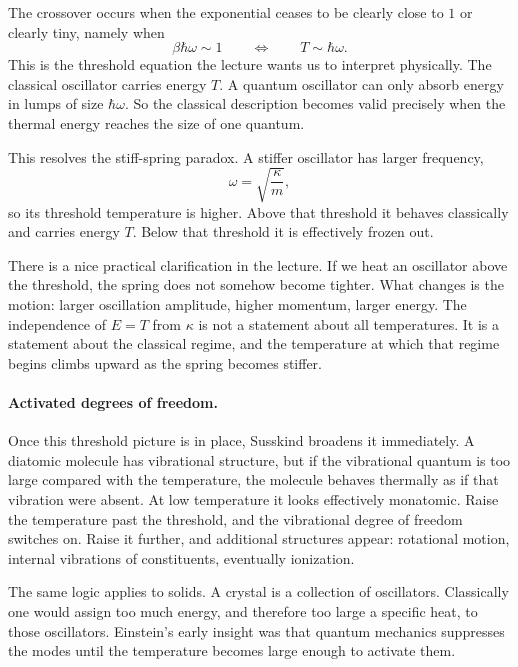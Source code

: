 The crossover occurs when the exponential ceases to be clearly close to \(1\) or clearly tiny, namely when
\begin{equation}
\beta\hbar\omega\sim 1
\qquad\Longleftrightarrow\qquad
T\sim \hbar\omega.
\end{equation}
This is the threshold equation the lecture wants us to interpret physically. The classical oscillator carries energy \(T\). A quantum oscillator can only absorb energy in lumps of size \(\hbar\omega\). So the classical description becomes valid precisely when the thermal energy reaches the size of one quantum.

This resolves the stiff-spring paradox. A stiffer oscillator has larger frequency,
\begin{equation}
\omega=\sqrt{\frac{\kappa}{m}},
\end{equation}
so its threshold temperature is higher. Above that threshold it behaves classically and carries energy \(T\). Below that threshold it is effectively frozen out.

There is a nice practical clarification in the lecture. If we heat an oscillator above the threshold, the spring does not somehow become tighter. What changes is the motion: larger oscillation amplitude, higher momentum, larger energy. The independence of \(E=T\) from \(\kappa\) is not a statement about all temperatures. It is a statement about the classical regime, and the temperature at which that regime begins climbs upward as the spring becomes stiffer.

\paragraph{Activated degrees of freedom.} Once this threshold picture is in place, Susskind broadens it immediately. A diatomic molecule has vibrational structure, but if the vibrational quantum is too large compared with the temperature, the molecule behaves thermally as if that vibration were absent. At low temperature it looks effectively monatomic. Raise the temperature past the threshold, and the vibrational degree of freedom switches on. Raise it further, and additional structures appear: rotational motion, internal vibrations of constituents, eventually ionization.

The same logic applies to solids. A crystal is a collection of oscillators. Classically one would assign too much energy, and therefore too large a specific heat, to those oscillators. Einstein's early insight was that quantum mechanics suppresses the modes until the temperature becomes large enough to activate them.

